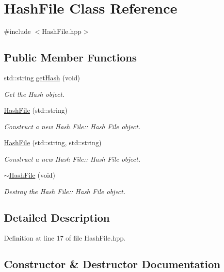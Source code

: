 \hypertarget{class_hash_file}{}\section{Hash\+File Class Reference}
\label{class_hash_file}


{\ttfamily \#include $<$Hash\+File.\+hpp$>$}

\subsection*{Public Member Functions}
\begin{DoxyCompactItemize}
\item 
std\+::string \hyperlink{class_hash_file_a63590090cde4f86ec04687f7f380fb71}{get\+Hash} (void)
\begin{DoxyCompactList}\small\item\em Get the Hash object. \end{DoxyCompactList}\item 
\hyperlink{class_hash_file_abdb00953b496b5742ba036a12d0ab72e}{Hash\+File} (std\+::string)
\begin{DoxyCompactList}\small\item\em Construct a new Hash File\+:\+: Hash File object. \end{DoxyCompactList}\item 
\hyperlink{class_hash_file_afe9a013898ac44694779d413eba3b196}{Hash\+File} (std\+::string, std\+::string)
\begin{DoxyCompactList}\small\item\em Construct a new Hash File\+:\+: Hash File object. \end{DoxyCompactList}\item 
\hyperlink{class_hash_file_a88cce5bf687611a893fbf728c609f4d2}{$\sim$\+Hash\+File} (void)
\begin{DoxyCompactList}\small\item\em Destroy the Hash File\+:\+: Hash File object. \end{DoxyCompactList}\end{DoxyCompactItemize}


\subsection{Detailed Description}


Definition at line 17 of file Hash\+File.\+hpp.



\subsection{Constructor \& Destructor Documentation}
\mbox{\label{class_hash_file_abdb00953b496b5742ba036a12d0ab72e}} 
